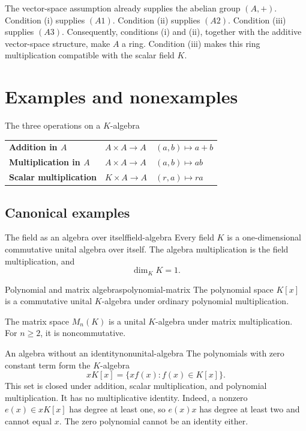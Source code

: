 \documentclass[10pt,a4paper]{article}
\begin{document}
\begin{precision}
The vector-space assumption already supplies the abelian group $(A,+)$.
Condition (i) supplies $(A1)$. Condition (ii) supplies $(A2)$. Condition (iii)
supplies $(A3)$. Consequently, conditions (i) and (ii), together with the
additive vector-space structure, make $A$ a ring. Condition (iii) makes this
ring multiplication compatible with the scalar field $K$.
\end{precision}

\section{Examples and nonexamples}

\begin{summarybox}{The three operations on a $K$-algebra}
\renewcommand{\arraystretch}{1.25}
\begin{tabularx}{\linewidth}{>{\bfseries}p{4.1cm}p{4.2cm}X}
Addition in $A$ & $A\times A\to A$ & $(a,b)\mapsto a+b$\\
Multiplication in $A$ & $A\times A\to A$ & $(a,b)\mapsto ab$\\
Scalar multiplication & $K\times A\to A$ & $(r,a)\mapsto ra$
\end{tabularx}
\end{summarybox}

\subsection{Canonical examples}

\begin{examplebox}{The field as an algebra over itself}{field-algebra}
Every field $K$ is a one-dimensional commutative unital algebra over itself.
The algebra multiplication is the field multiplication, and
\[
  \dim_K K=1.
\]
\end{examplebox}

\begin{examplebox}{Polynomial and matrix algebras}{polynomial-matrix}
The polynomial space $K[x]$ is a commutative unital $K$-algebra under ordinary
polynomial multiplication.

The matrix space $M_n(K)$ is a unital $K$-algebra under matrix multiplication.
For $n\geq2$, it is noncommutative.
\end{examplebox}

\begin{examplebox}{An algebra without an identity}{nonunital-algebra}
The polynomials with zero constant term form the $K$-algebra
\[
  xK[x]=\{xf(x):f(x)\in K[x]\}.
\]
This set is closed under addition, scalar multiplication, and polynomial
multiplication. It has no multiplicative identity. Indeed, a nonzero
$e(x)\in xK[x]$ has degree at least one, so $e(x)x$ has degree at least two
and cannot equal $x$. The zero polynomial cannot be an identity either.
\end{examplebox}
\end{document}
